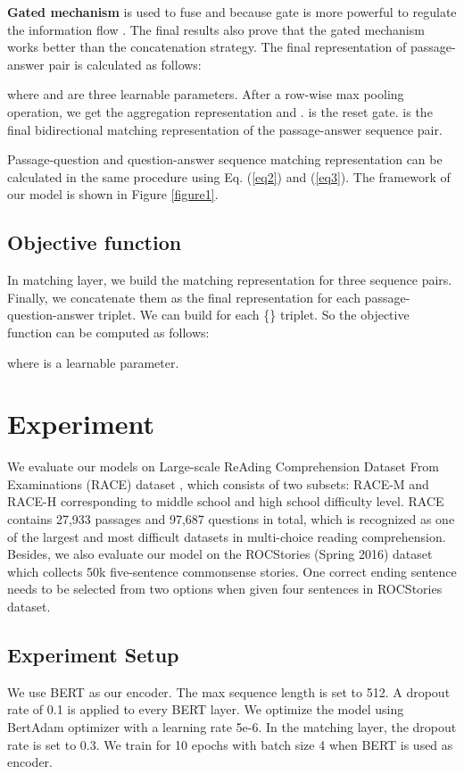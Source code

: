 \documentclass[11pt,a4paper]{article}
\begin{document}
	\textbf{Gated mechanism} is used to fuse  and  because gate is more powerful to regulate the information flow \cite{highway}. The final results also prove that the gated mechanism works better than the concatenation strategy. The final representation of passage-answer pair is calculated as follows:
	 
	where  and  are three learnable parameters.  After a row-wise max pooling operation, we get the aggregation representation  and .  is the reset gate.  is the final bidirectional matching representation of the passage-answer sequence pair. 
	
	Passage-question and question-answer sequence matching representation  can be calculated in the same procedure using Eq. (\ref{eq2}) and (\ref{eq3}). The framework of our model is shown in Figure \ref{figure1}.
	




	\subsection{Objective function}
	In matching layer, we build the matching representation  for three sequence pairs. Finally, we concatenate them as the final representation  for each passage-question-answer triplet. We can build  for each \{\} triplet. So the objective function can be computed as follows:
	
	where  is a learnable parameter. 
	
	\section{Experiment}
	We evaluate our models on Large-scale ReAding Comprehension Dataset From Examinations (RACE) dataset \cite{Lai-2017}, which consists of two subsets: RACE-M and RACE-H corresponding to middle school and high school difficulty level. RACE contains 27,933 passages and 97,687 questions in total, which is recognized as one of the largest and most difficult datasets in multi-choice reading comprehension. Besides, we also evaluate our model on the ROCStories (Spring 2016) dataset which collects 50k five-sentence commonsense stories. One correct ending sentence needs to be selected from two options when given four sentences in ROCStories dataset.  
	
	\subsection{Experiment Setup} 
	We use BERT as our encoder. The max sequence length is set to 512. A dropout rate of 0.1 is applied to every BERT layer. We optimize the model using BertAdam \cite{Devlin-18} optimizer with a learning rate 5e-6. In the matching layer, the dropout rate is set to 0.3. We train for 10 epochs with batch size 4 when BERT is used as encoder.  
	
\end{document}

